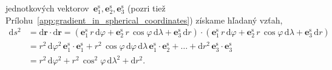\documentclass[a4paper, 12pt]{book}
\newcommand{\diff}{\mathrm d}
\let\vec\mathbf
\begin{document}
jednotkových vektorov~$\vec e_1^\mathrm{s}, \vec e_2^\mathrm{s}, \vec 
e_3^\mathrm{s}$ (pozri tiež 
Prílohu~\ref{app:gradient_in_spherical_coordinates}) získame hľadaný vzťah,
%
\begin{equation}
\begin{split}
\diff s^2 &= \diff \vec r \cdot \diff \vec r = \left( \vec e_1^\mathrm{s} \, 
r \, \diff \varphi + \vec e_2^\mathrm{s} \, r \, \cos\varphi \, \diff \lambda 
+ \vec e_3^\mathrm{s} \, \diff r \right) \cdot \left( \vec e_1^\mathrm{s} \, 
r \, \diff \varphi + \vec e_2^\mathrm{s} \, r \, \cos\varphi \, \diff \lambda 
+ \vec e_3^\mathrm{s} \, \diff r \right)\\
%
&= r^2 \, \diff \varphi^2 \, \vec e_1^\mathrm{s} \cdot \vec e_1^\mathrm{s} 
+ r^2 \, \cos\varphi \, \diff\varphi \, \diff\lambda \, \vec e_1^\mathrm{s} 
\cdot \vec e_2^\mathrm{s} + \dots + \diff r^2 \, \vec e_3^\mathrm{s} \cdot \vec 
e_3^\mathrm{s}\\
%
&=  r^2 \, \diff\varphi^2 + r^2 \, \cos^2\varphi \, \diff\lambda^2 + \diff 
r^2{.}
\end{split}
\end{equation}







\printbibliography[title=Literat\'{u}ra]

\end{document}
